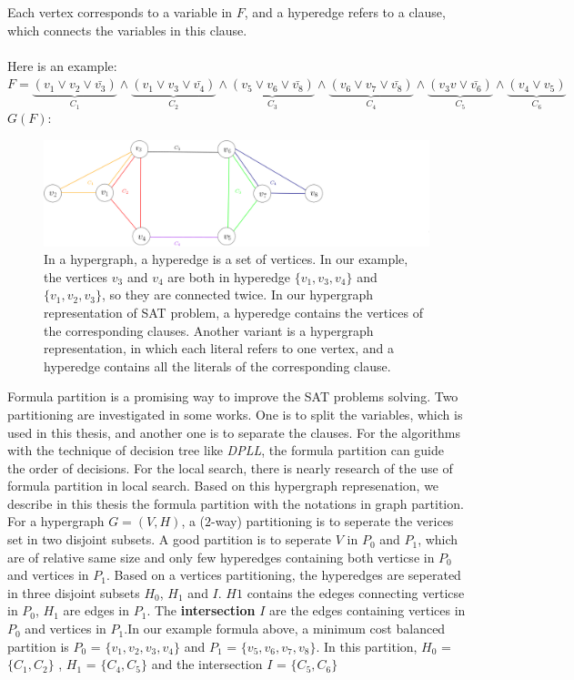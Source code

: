 \documentclass[12pt,a4paper,twoside]{scrartcl}
\numberwithin{equation}{section}
\begin{document}
  Each vertex corresponds to a variable in $F$, and a hyperedge refers to a clause, which connects the variables in this clause. \\
\\
Here is an example:\\
$F =\underbrace{(v_1 \lor v_2 \lor \bar{v_3})}_\text{$C_1$} \land \underbrace{(v_1 \lor v_3\lor \bar{v_4})}_\text{$C_2$}\land \underbrace{(v_5 \lor v_6\lor \bar{v_8})}_\text{$C_3$}\land \underbrace{(v_6 \lor v_7\lor \bar{v_8})}_\text{$C_4$}\land \underbrace{(v_3v\lor \bar{v_6})}_\text{$C_5$}\land \underbrace{(v_4 \lor v_5)}_\text{$C_6$}$\\
$G(F)$:
\begin{figure}[H]
\begin{center}
  \includegraphics[scale = 0.4]{1/hypergraph.png}
  \end{center}
  \caption{In a hypergraph, a hyperedge is a set of vertices. In our example, the vertices  $v_3$  and $v_4$ are both in hyperedge $\{v_1, v_3, v_4\}$ and $\{v_1, v_2, v_3\}$, so they are connected twice. In our hypergraph representation of SAT problem, a hyperedge contains the vertices of the corresponding clauses. Another variant is a hypergraph representation, in which each literal refers to one vertex, and a hyperedge contains all the literals of the corresponding clause.}
  \label{hypergraph representation}
  \end{figure}

Formula partition is a promising way to improve the SAT problems solving. Two partitioning are investigated in some works. One is to split the variables, which is used in this thesis, and another one is to separate the clauses. For the algorithms with the technique of decision tree like \emph{DPLL}, the formula partition can guide the order of decisions. For the local search, there is nearly research of the use of formula partition in local search. Based on this hypergraph represenation, we describe in this thesis the formula partition with the notations in graph partition. For a hypergraph $G = (V,H)$,  a ($2$-way) partitioning is to seperate the verices set in two disjoint subsets. A good partition is to seperate $V$ in $P_0$ and $P_1$, which are of relative same size and only few hyperedges containing both verticse in $P_0$ and vertices in $P_1$.  Based on a vertices partitioning, the hyperedges are seperated in three disjoint subsets $H_0$, $H_1$ and $I$. $H1$ contains the edeges connecting verticse in $P_0$, $H_1$ are edges in $P_1$. The \textbf{intersection} $I$ are the edges containing vertices in $P_0$ and vertices in $P_1$.In our example formula above, a minimum cost balanced partition is $P_0$ = $\{v_1,v_2, v_3, v_4\}$ and $P_1$ = $\{v_5,v_6, v_7, v_8\}$. In this partition, $H_0$ = $\{C_1,C_2\}$ , $H_1$ = $\{C_4,C_5\}$ and the intersection $I$ = $\{C_5,C_6\}$ 
\end{document}
